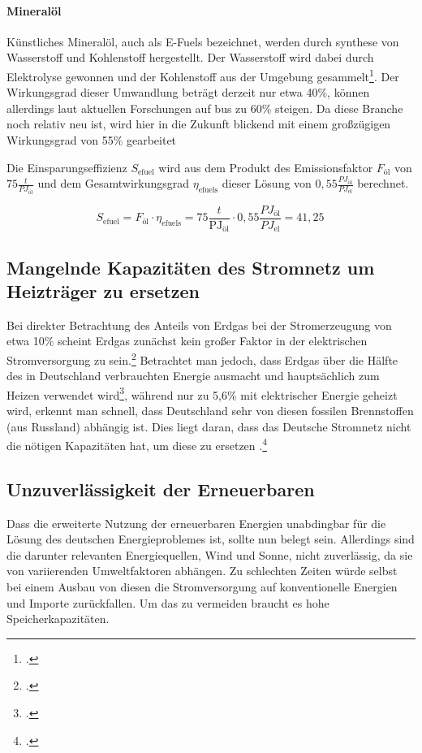 \documentclass[12pt, ngerman]{article}
\newcommand{\el}{_{\text{el}}}
\begin{document}
    \paragraph{Mineralöl}


    Künstliches Mineralöl, auch als E-Fuels bezeichnet, werden durch synthese von Wasserstoff und Kohlenstoff
    hergestellt.
    Der Wasserstoff wird dabei durch Elektrolyse gewonnen und der Kohlenstoff aus der Umgebung
    gesammelt\footcite{EFuel2022}.
    Der Wirkungsgrad dieser Umwandlung beträgt derzeit nur etwa 40\%, können allerdings laut aktuellen Forschungen
    auf bus zu 60\% steigen.
    Da diese Branche noch relativ neu ist, wird hier in die Zukunft blickend mit einem großzügigen Wirkungsgrad von
    55\% gearbeitet

    Die Einsparungseffizienz \(S_{\text{efuel}}\) wird aus dem Produkt des Emissionsfaktor \(F_{\text{öl}}\) von
    \(75\frac{t}{PJ_{\text{öl}}}\)
    und dem Gesamtwirkungsgrad \(\eta_{\text{efuels}}\) dieser Lösung von $0,55\frac{PJ_{\text{öl}}}{PJ\el}$ berechnet.


    \[S_\text{efuel} = F_{\text{öl}} \cdot \eta_{\text{efuels}} = 75\frac{t}{\text{PJ}_{\text{öl}}} \cdot 0,
    55\frac{PJ_\text{öl}}{PJ\el} = 41,25\frac{}{}\]

    \subsection{Mangelnde Kapazitäten des Stromnetz um Heizträger zu ersetzen}

    Bei direkter Betrachtung des Anteils von Erdgas bei der Stromerzeugung von etwa 10\% scheint Erdgas zunächst kein
    großer Faktor in der elektrischen Stromversorgung zu sein.\footcite{SMARDHoherEEAnteil,EnergieWofurErdgas}
    Betrachtet man jedoch, dass Erdgas über die Hälfte des in Deutschland verbrauchten Energie ausmacht und
    hauptsächlich zum Heizen verwendet wird\footcite{Anwendungsbereiche,EnergieWofurErdgas},
    während nur zu 5,6\% mit elektrischer Energie geheizt wird, erkennt man schnell, dass Deutschland sehr von diesen
    fossilen Brennstoffen (aus Russland) abhängig ist.
    Dies liegt daran, dass das Deutsche Stromnetz nicht die nötigen Kapazitäten hat, um diese zu ersetzen
    .\footcite{EnergieWofurErdgas}

    \subsection{Unzuverlässigkeit der Erneuerbaren}
    Dass die erweiterte Nutzung der erneuerbaren Energien unabdingbar für die Lösung des deutschen Energieproblemes
    ist, sollte nun belegt sein.
    Allerdings sind die darunter relevanten Energiequellen, Wind und Sonne, nicht zuverlässig, da sie von
    variierenden Umweltfaktoren abhängen.
    Zu schlechten Zeiten würde selbst bei einem Ausbau von diesen die Stromversorgung auf konventionelle Energien und
    Importe zurückfallen.
    Um das zu vermeiden braucht es hohe Speicherkapazitäten.
\end{document}
